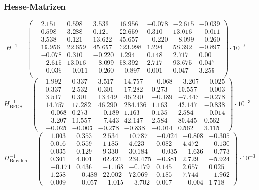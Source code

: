 \documentclass[xcolor = dvipsnames, notheorems, 10pt]{beamer}
\theoremstyle{definition}
\begin{document}
\begin{frame}
\frametitle{Hesse-Matrizen}
	\scriptsize
		$$H^{-1} = \begin{pmatrix}
			&2.151 &0.598 &3.538 &16.956 &-0.078 &-2.615 &-0.039 \\
			&0.598 &3.288 &0.121 &22.659 &0.310 &13.016 &-0.011 \\
			&3.538 &0.121 &13.622 &45.657 &-0.220 &-8.099 &-0.260 \\
			&16.956 &22.659 &45.657 &323.998 &1.294 &58.392 &-0.897 \\
			&-0.078 &0.310 &-0.220 &1.294 &0.148 &2.717 &0.001 \\
			&-2.615 &13.016 &-8.099 &58.392 &2.717 &93.675 &0.047 \\
			&-0.039 &-0.011 &-0.260 &-0.897 &0.001 &0.047 &3.256 \\
		\end{pmatrix} \cdot 10^{-3}$$
		$$H^{-1}_\text{BFGS} = \begin{pmatrix}
			&1.992 &0.337 &3.517 &14.757 &-0.068 &-3.207 &-0.025 \\
			&0.337 &2.532 &0.301 &17.282 &0.273 &10.557 &-0.003 \\
			&3.517 &0.301 &13.449 &46.290 &-0.189 &-7.443 &-0.278 \\
			&14.757 &17.282 &46.290 &284.436 &1.163 &42.147 &-0.838 \\
			&-0.068 &0.273 &-0.189 &1.163 &0.135 &2.584 &-0.014 \\
			&-3.207 &10.557 &-7.443 &42.147 &2.584 &80.445 &0.562 \\
			&-0.025 &-0.003 &-0.278 &-0.838 &-0.014 &0.562 &3.115
		\end{pmatrix} \cdot 10^{-3}$$
		$$H^{-1}_\text{Broyden} = \begin{pmatrix}
			&1.003 &0.353 &2.534 &10.787 &-0.024 &-0.808 &-0.305 \\
			&0.016 &0.559 &1.185 &4.623 &0.082 &4.472 &-0.130 \\
			&0.035 &0.129 &9.330 &30.184 &-0.035 &-1.636 &-0.773 \\
			&0.301 &4.001 &62.421 &234.475 &-0.381 &2.729 &-5.924 \\
			&-0.171 &0.436 &-1.168 &-0.179 &0.145 &2.657 &0.025 \\
			&1.258 &-0.488 &22.002 &72.069 &0.185 &7.744 &-1.962 \\
			&0.009 &-0.057 &-1.015 &-3.702 &0.007 &-0.004 &1.718
		\end{pmatrix} \cdot 10^{-3}$$
	\normalsize
\end{frame}
\end{document}
